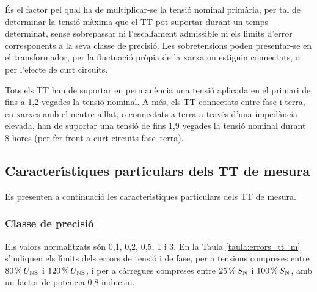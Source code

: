  \'{E}s el factor pel qual ha de
multiplicar-se la tensi\'{o} nominal prim\`{a}ria, per tal de determinar la
tensi\'{o} m\`{a}xima que el TT pot suportar durant un temps determinat,
sense sobrepassar ni l'escalfament admissible ni els l\'{\i}mits d'error
corresponents a la seva classe de precisi\'{o}. Les sobretensions poden
presentar-se en el transformador,  per la fluctuaci\'{o}
    pr\`{o}pia de la xarxa on estiguin connectats, o per l'efecte de curt
    circuits.

    Tots els  TT han de suportar   en perman\`{e}ncia una tensi\'{o} aplicada en
    el primari de fins a  1,2 vegades la tensi\'{o} nominal. A m\'{e}s, els TT
connectats entre fase i terra, en xarxes amb el neutre a\"{\i}llat, o
connectats a terra a trav\'{e}s d'una imped\`{a}ncia elevada, han de suportar
    una tensi\'{o} de fins 1,9 vegades la tensi\'{o} nominal durant 8 hores (per fer front a
    curt circuits fase--terra).


\subsection{Caracter\'{\i}stiques particulars dels TT de mesura}

Es presenten a continuaci\'{o} les caracter\'{\i}stiques particulars dels TT
de mesura.

\subsubsection{Classe de precisi\'{o}}

 Els valors normalitzats s\'{o}n
0,1, 0,2, 0,5, 1 i 3. En la Taula \vref{taula:errors_tt_m}
s'indiquen els l\'{\i}mits dels errors de tensi\'{o} i  de fase, per a
tensions compreses entre $80\mathrm{\,\%}\,U_\mathrm{NS}$ i
$120\mathrm{\,\%}\,U_\mathrm{NS}$, i per a c\`{a}rregues compreses entre
$25\mathrm{\,\%}\,S_\mathrm{N}$ i $100\mathrm{\,\%}\,S_\mathrm{N}$, amb un factor de
potencia 0,8 inductiu.


